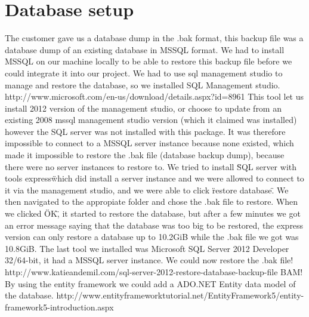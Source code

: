 \section{Database setup}
The customer gave us a database dump in the .bak format, this backup file was a database dump of an existing database in MSSQL format. We had to install MSSQL on our machine locally to be able to restore this backup file before we could integrate it into our project. We had to use sql management studio to manage and restore the database, so we installed SQL Management studio.
http://www.microsoft.com/en-us/download/details.aspx?id=8961
This tool let us install 2012 version of the management studio, or choose to update from an existing 2008 mssql management studio version (which it claimed was installed) however the SQL server was not installed with this package.
It was therefore impossible to connect to a MSSQL server instance because none existed, which made it impossible to restore the .bak file (database backup dump), because there were no server instances to restore to.
We tried to install \"SQL server with tools express\" which did install a server instance and we were allowed to connect to it via the management studio, and we were able to click \"restore database\". We then navigated to the appropiate folder and chose the .bak file to restore. When we clicked \"OK\", it started to restore the database, but after a few minutes we got an error message saying that the database was too big to be restored, the express version can only restore a database up to 10.2GiB while the .bak file we got was 10.8GiB.
The last tool we installed was Microsoft SQL Server 2012 Developer 32/64-bit, it had a MSSQL server instance.
We could now restore the .bak file! http://www.katieandemil.com/sql-server-2012-restore-database-backup-file BAM!
By using the entity framework we could add a ADO.NET Entity data model of the database. http://www.entityframeworktutorial.net/EntityFramework5/entity-framework5-introduction.aspx